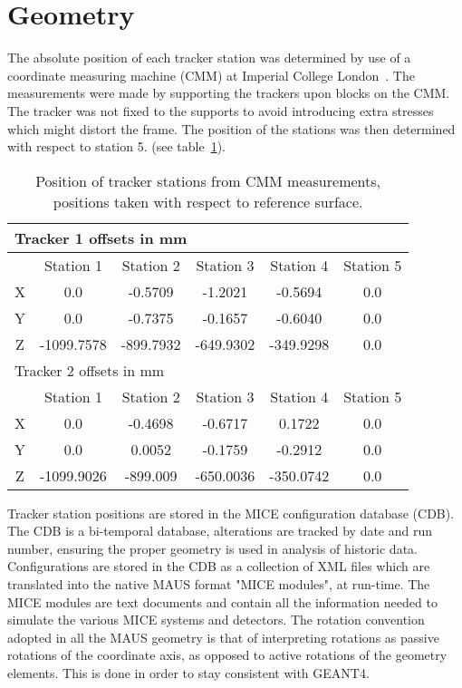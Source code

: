 \section{Geometry}
\label{sec:Geometry}

  The absolute position of each tracker station was determined by use of a coordinate measuring machine (CMM) at Imperial College London~\cite{MiceTrackers}.  The measurements were made by supporting the trackers upon blocks on the CMM. The tracker was not fixed to the supports to avoid introducing extra stresses which might distort the frame. The position of the stations was then determined with respect to station 5. (see table~\ref{tab:CMM}).
  
  \begin{table} [tbp]
  \begin{center}
  \begin{tabular} {|c|c|c|c|c|c|}
    \hline
    \multicolumn{6}{|l|}{Tracker 1 offsets in mm} \\
    \hline
    & Station 1 & Station 2 & Station 3 & Station 4 & Station 5 \\
    \hline
    X & 0.0 & -0.5709 & -1.2021 & -0.5694 & 0.0 \\
    Y & 0.0 & -0.7375 & -0.1657 & -0.6040 & 0.0 \\
    Z & -1099.7578 & -899.7932 & -649.9302 & -349.9298 & 0.0 \\
    \hline
    \hline
    \multicolumn{6}{|l|}{Tracker 2 offsets in mm} \\
    \hline
    & Station 1 & Station 2 & Station 3 & Station 4 & Station 5 \\
    \hline
    X & 0.0 & -0.4698 & -0.6717 & 0.1722 & 0.0 \\
    Y & 0.0 & 0.0052 & -0.1759 & -0.2912 & 0.0 \\
    Z & -1099.9026 & -899.009 & -650.0036 & -350.0742 & 0.0 \\
    \hline
  \end{tabular}
  \caption{\label{tab:CMM} Position of tracker stations from CMM measurements, positions taken with respect to reference surface.}
  \end{center}
  \end{table}
  
  Tracker station positions are stored in the MICE configuration database (CDB). The CDB is a bi-temporal database, alterations are tracked by date and run number, ensuring the proper geometry is used in analysis of historic data.  Configurations are stored in the CDB as a collection of XML files which are translated into the native MAUS format "MICE modules", at run-time.  The MICE modules are text documents and contain all the information needed to simulate the various MICE systems and detectors. The rotation convention adopted in all the MAUS geometry is that of interpreting rotations as passive rotations of the coordinate axis, as opposed to active rotations of the geometry elements. This is done in order to stay consistent with GEANT4.
  
